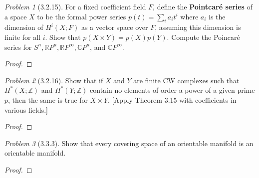 \documentclass[10pt]{article}
\newcommand{\sk}{\vskip 10mm}
\newcommand{\bb}[1]{\mathbb{#1}}
\theoremstyle{remark}
\newtheorem{problem}{Problem}
\begin{document}
\begin{problem}[3.2.15]
  For a fixed coefficient field $F$, define the \textbf{Pointcar\'e series}
  of a space $X$ to be the formal power series $p(t)=\sum_ia_it^i$ where $a_i$
  is the dimension of $H^i(X;F)$ as a vector space over $F$, assuming this
  dimension is finite for all $i$. Show that $p(X\times Y)=p(X)p(Y)$. Compute
  the Poincar\'e series for $S^n,\bb{R}P^n,\bb{R}P^\infty,\bb{C}P^n$,
  and $\bb{C}P^\infty$.
\end{problem}

\begin{proof}
  
\end{proof}

\sk

\begin{problem}[3.2.16]
  Show that if $X$ and $Y$ are finite CW complexes such that $H^*(X;\bb{Z})$
  and $H^*(Y;\bb{Z})$ contain no elements of order a power of a given prime $p$,
  then the same is true for $X\times Y$. [Apply Theorem 3.15 with coefficients
  in various fields.]
\end{problem}

\begin{proof}
  
\end{proof}

\sk

\begin{problem}[3.3.3]
  Show that every covering space of an orientable manifold is an orientable
  manifold.
\end{problem}

\begin{proof}
  
\end{proof}
\end{document}

